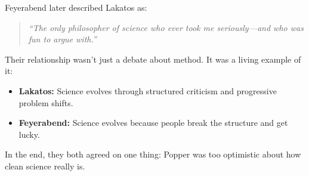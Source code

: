 \begin{tcolorbox}[colback=blue!5!white, colframe=blue!50!black, 
  title={\textbf{Historical Sidebar: Feyerabend and Lakatos — Frenemies of Scientific Method}}]
\bigskip

Feyerabend later described Lakatos as:
\begin{quote}
    \textit{“The only philosopher of science who ever took me seriously—and who was fun to argue with.”}
\end{quote}

\bigskip

Their relationship wasn’t just a debate about method. It was a living example of it:
\begin{itemize}
  \item \textbf{Lakatos:} Science evolves through structured criticism and progressive problem shifts.
  \item \textbf{Feyerabend:} Science evolves because people break the structure and get lucky.
\end{itemize}

\bigskip

In the end, they both agreed on one thing:  
Popper was too optimistic about how clean science really is.

\end{tcolorbox}


